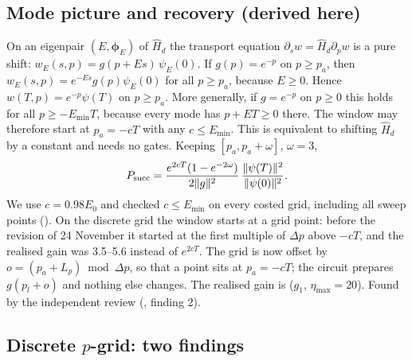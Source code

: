 \documentclass[11pt,a4paper]{article}
\begin{document}
\subsection*{Mode picture and recovery (derived here)}

On an eigenpair $(E,\boldsymbol\phi_E)$ of $\hat H_d$ the transport equation
$\partial_sw=\hat H_d\partial_pw$ is a pure shift:
$w_E(s,p)=g(p+Es)\,\psi_E(0)$. If $g(p)=e^{-p}$ on $p\ge p_a$, then
$w_E(s,p)=e^{-Es}g(p)\psi_E(0)$ for all $p\ge p_a$, because $E\ge0$.
Hence $w(T,p)=e^{-p}\psi(T)$ on $p\ge p_a$. More generally, if $g=e^{-p}$ on
$p\ge0$ this holds for all $p\ge-E_{\min}T$, because every mode has
$p+ET\ge0$ there. The window may therefore start at $p_a=-cT$ with any
$c\le E_{\min}$. This is equivalent to shifting $\hat H_d$ by a constant and
needs no gates. Keeping $[p_a,p_a+\omega]$, $\omega=3$,
\[
 P_{\rm succ}=\frac{e^{2cT}(1-e^{-2\omega})}{2\|g\|^2}\,
 \frac{\|\psi(T)\|^2}{\|\psi(0)\|^2}.
\]
We use $c=0.98E_0$ and checked $c\le E_{\min}$ on every costed grid, including
all sweep points (). On the discrete grid the
window starts at a grid point: before the revision of 24 November it started at the first
multiple of $\Delta p$ above $-cT$, and the realised gain was 3.5--5.6 instead of
$e^{2cT}$. The grid is now offset by $o=(p_a+L_p)\bmod\Delta p$, so that a point
sits at $p_a=-cT$; the circuit prepares $g(p_l+o)$ and nothing else changes. The realised gain is
\WindowGain{} ($g_1$, $\eta_{\max}=20$). Found by the independent review
(, finding 2).

\subsection*{Discrete $p$-grid: two findings}
\end{document}
